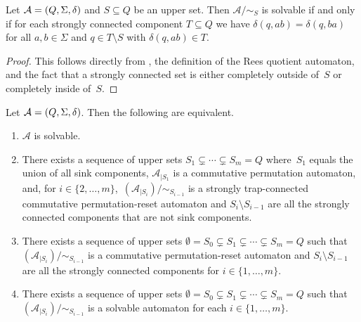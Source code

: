 \begin{corollary} Let $\mathcal A = (Q, \Sigma, \delta)$
	and $S \subseteq Q$ be an upper set.
	Then $\mathcal A / {\sim_S}$ is solvable
	if and only if for each strongly connected component
	$T \subseteq Q$ 
	we have $\delta(q, ab) = \delta(q, ba)$
	for all $a,b \in \Sigma$
	and $q \in T \setminus S$ with $\delta(q, ab) \in T$.
\end{corollary}
\begin{proof}
	This follows directly from ,
	the definition of the Rees quotient automaton,
	and the fact that a strongly connected set is either completely
	outside of~$S$ or completely inside of~$S$.	
\end{proof}

\begin{proposition}	\label{prelim:classes:solv:prop:char-seq}
Let $\mathcal A = (Q, \Sigma, \delta)$.
Then the following are equivalent.
\begin{enumerate}
	\item \label{prelim:thm:solvable:1} $\mathcal A$ is solvable. 
	
	\item \label{prelim:thm:solvable:2} There exists a sequence of upper sets
	$
	S_1 \subsetneq \cdots \subsetneq S_m = Q
	$
	where~$S_1$ equals the union of all sink components,
	$\mathcal A_{|S_1}$ is a commutative permutation automaton, and, for $i \in \{2,\ldots,m\}$,~$( \mathcal A_{|S_i} )/ {\sim_{S_{i-1}}}$ is
	a strongly trap-connected commutative permutation-reset automaton and $S_{i} \setminus S_{i-1}$ are all the strongly connected components that are not sink components.
		
	\item \label{prelim:classes:solv:prop:char-seq:3} There exists a sequence of upper sets
	$
	\emptyset = S_0 \subsetneq S_1 \subsetneq \cdots \subsetneq S_m = Q
	$
	such that~$( \mathcal A_{|S_i} )/ {\sim_{S_{i-1}}}$
	is a commutative permutation-reset automaton
	and $S_{i} \setminus S_{i-1}$ are all the strongly connected components
	for $i \in \{1,\ldots,m\}$. 
	
	\item \label{prelim:thm:solvable:solv-sequence} There exists a sequence of upper sets
	$
	\emptyset = S_0 \subsetneq S_1 \subsetneq \cdots \subsetneq S_m = Q
	$
	such that~$( \mathcal A_{|S_i} )/ {\sim_{S_{i-1}}}$ 
	is a solvable automaton for each $i \in \{1,\ldots,m\}$.   
\end{enumerate}
\end{proposition}
